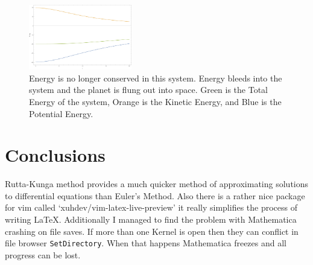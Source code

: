 \documentclass{article}
\begin{document}
\begin{figure}[h]
	\begin{center}
		\includegraphics[width=0.4\textwidth]{r3e.pdf}
	\end{center}
	\caption{Energy is no longer conserved in this system. Energy bleeds into the system and the planet is flung out into space. Green is the Total Energy of the system, Orange is the Kinetic Energy, and Blue is the Potential Energy.}
	\label{fig:r3e}
\end{figure}

\section{Conclusions}

Rutta-Kunga method provides a much quicker method of approximating solutions to differential equations than Euler's Method. Also there is a rather nice package for vim called `xuhdev/vim-latex-live-preview' it really simplifies the process of writing \LaTeX. Additionally I managed to find the problem with Mathematica crashing on file saves. If more than one Kernel is open then they can conflict in file browser \texttt{SetDirectory}. When that happens Mathematica freezes and all progress can be lost.
\end{document}
